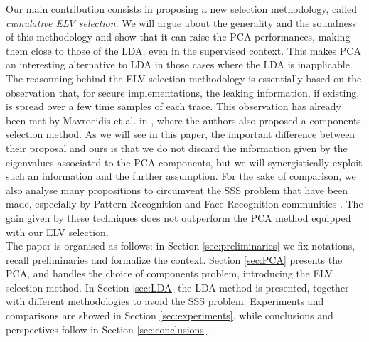  Our main contribution consists in proposing a new selection methodology, called {\em cumulative ELV selection}. We will argue about the generality and the soundness of this methodology and show that it can raise the PCA performances, making them close to those of the LDA, even in the supervised context. This makes PCA an interesting alternative to LDA in those cases where the LDA is inapplicable. The reasonning behind the ELV selection methodology is essentially based on the observation that, for secure implementations, the leaking information, if existing, is spread over a few time samples of each trace. This observation has already been met by Mavroeidis et al. in \cite{SCAclassProbl}, where the authors  also proposed a components selection method. As we will see in this paper, the important difference between their proposal and ours is that we do not discard the information given by the eigenvalues associated to the PCA components, but we will synergistically exploit such an information and the further assumption. For the sake of comparison, we also analyse many propositions to circumvent the SSS problem that have been made, especially by Pattern Recognition and Face Recognition communities \cite{eigenfaces,Chen2000,huang,Yu01adirect}. The gain given by these techniques does not outperform the PCA method equipped with our ELV selection.\\

The paper is organised as follows: in Section \ref{sec:preliminaries} we fix notations, recall preliminaries and formalize the context. Section \ref{sec:PCA} presents the PCA, and handles the choice of components problem, introducing the  ELV selection method. In Section \ref{sec:LDA} the LDA method is presented, together with different methodologies to avoid the SSS problem. Experiments and comparisons are showed in Section \ref{sec:experiments}, while conclusions and perspectives follow in Section \ref{sec:conclusions}. 
